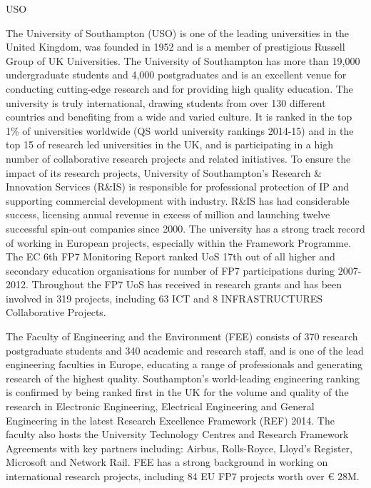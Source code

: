 \begin{sitedescription}{USO}




  The University of Southampton (USO) is one of the leading
  universities in the United Kingdom, was founded in 1952 and is a
  member of prestigious Russell Group of UK Universities. The
  University of Southampton has more than 19,000 undergraduate
  students and 4,000 postgraduates and is an excellent venue for
  conducting cutting-edge research and for providing high quality
  education. The university is truly international, drawing students
  from over 130 different countries and benefiting from a wide and
  varied culture. It is ranked in the top 1\% of universities
  worldwide (QS world university rankings 2014-15) and in the top 15
  of research led universities in the UK, and is participating in a
  high number of collaborative research projects and related
  initiatives. To ensure the impact of its research projects,
  University of Southampton’s Research \& Innovation Services (R\&IS)
  is responsible for professional protection of IP and supporting
  commercial development with industry. R\&IS has had considerable
  success, licensing annual revenue in excess of million and
  launching twelve successful spin-out companies since 2000.  The
  university has a strong track record of working in European
  projects, especially within the Framework Programme. The EC 6th FP7
  Monitoring Report ranked UoS 17th out of all higher and secondary
  education organisations for number of FP7 participations during
  2007-2012. Throughout the FP7 UoS has received  in
  research grants and has been involved in 319 projects, including 63
  ICT and 8 INFRASTRUCTURES Collaborative Projects. 

  The Faculty of Engineering and the Environment (FEE) consists of 370
  research postgraduate students and 340 academic and research
  staff, and is one of the lead engineering faculties in Europe, educating
  a range of professionals and generating research of the highest
  quality. Southampton's world-leading engineering ranking is
  confirmed by being ranked first in the UK for the volume and quality
  of the research in Electronic Engineering, Electrical Engineering
  and General Engineering in the latest Research Excellence Framework
  (REF) 2014. The faculty also hosts the University Technology Centres
  and Research Framework Agreements with key partners including:
  Airbus, Rolls-Royce, Lloyd’s Register, Microsoft and Network
  Rail. FEE has a strong background in working on international
  research projects, including 84 EU FP7 projects worth over \euro
  28M.



\end{sitedescription}
